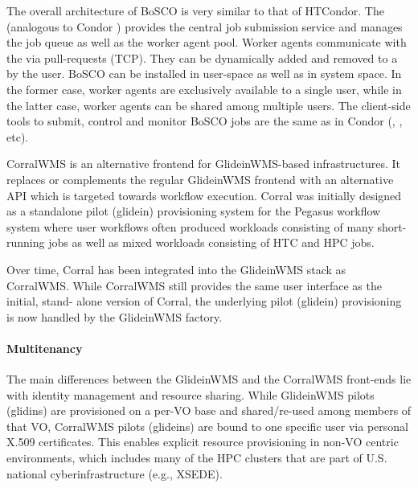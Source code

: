\documentclass{sig-alternate}
\begin{document}
The overall architecture of BoSCO is very similar to that of HTCondor. The
 (analogous to Condor ) provides the
central job submission service and manages the job queue as well as the worker
agent pool. Worker agents communicate with the  via
pull-requests (TCP). They can be dynamically added and removed to a
 by the user. BoSCO can be installed in user-space
as well as in system space. In the former case, worker agents are exclusively
available to a single user, while in the latter case, worker agents can be
shared among multiple users. The client-side tools to submit, control and
monitor BoSCO jobs are the same as in Condor (,
, etc).

CorralWMS is an alternative frontend for GlideinWMS-based infrastructures. It
replaces or complements the regular GlideinWMS frontend with an alternative
API which is targeted towards workflow execution. Corral was initially designed
as a standalone pilot (glidein) provisioning system for the Pegasus workflow
system where user workflows often produced workloads consisting of many
short-running jobs as well as mixed workloads consisting of HTC and HPC jobs.

Over time, Corral has been integrated into the GlideinWMS stack as CorralWMS.
While CorralWMS still provides the same user interface as the initial, stand-
alone version of Corral, the underlying pilot (glidein) provisioning is now
handled by the GlideinWMS factory.


\paragraph{Multitenancy}

The main differences between the GlideinWMS and the CorralWMS front-ends lie
with identity management and resource sharing. While GlideinWMS pilots
(glidins) are provisioned on a per-VO base and shared/re-used among members of
that VO, CorralWMS pilots (glideins) are bound to one specific user via
personal X.509 certificates. This enables explicit resource provisioning in
non-VO centric environments, which includes many of the HPC clusters that are
part of U.S. national cyberinfrastructure (e.g., XSEDE).
\end{document}
